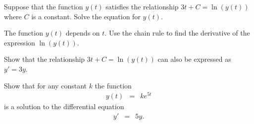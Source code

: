 \begin{problem}
\item Suppose that the function $y(t)$ satisfies the relationship
  $3t+C=\ln(y(t))$ where $C$ is a constant. Solve the equation for
  $y(t)$.

    \vfill

  \item The function $y(t)$ depends on $t$. Use the chain rule to find
    the derivative of the expression $\ln(y(t))$.
    \vfill

    \clearpage

  \item Show that the relationship $3t+C=\ln(y(t))$ can also be
    expressed as $y'=3y$.

    \vfill

  \item Show that for any constant $k$ the function
    \begin{eqnarray*}
      y(t) & = & k e^{5t}
    \end{eqnarray*}
    is a solution to the differential equation 
    \begin{eqnarray*}
      y' & = & 5y.
    \end{eqnarray*}
    \vfill

\end{problem}

